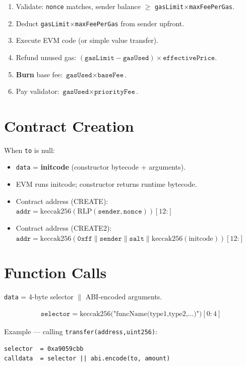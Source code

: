 \documentclass[12pt,a4paper,openany]{book}
\theoremstyle{definition}
\theoremstyle{plain}
\theoremstyle{remark}
\begin{document}
\begin{enumerate}
  \item Validate: \texttt{nonce} matches, sender balance $\geq$ \texttt{gasLimit}$\times$\texttt{maxFeePerGas}.
  \item Deduct \texttt{gasLimit}$\times$\texttt{maxFeePerGas} from sender upfront.
  \item Execute EVM code (or simple value transfer).
  \item Refund unused gas: $(\texttt{gasLimit}-\texttt{gasUsed})\times\texttt{effectivePrice}$.
  \item \textbf{Burn} base fee: $\texttt{gasUsed}\times\texttt{baseFee}$.
  \item Pay validator: $\texttt{gasUsed}\times\texttt{priorityFee}$.
\end{enumerate}

\section{Contract Creation}

When \texttt{to} is null:
\begin{itemize}
  \item \texttt{data} = \textbf{initcode} (constructor bytecode + arguments).
  \item EVM runs initcode; constructor returns runtime bytecode.
  \item Contract address (CREATE):
        $\texttt{addr}=\mathrm{keccak256}(\mathrm{RLP}(\texttt{sender},\texttt{nonce}))[12\text{:}]$
  \item Contract address (CREATE2):
        $\texttt{addr}=\mathrm{keccak256}(\texttt{0xff}\|\texttt{sender}\|\texttt{salt}\|\mathrm{keccak256(initcode)})[12\text{:}]$
\end{itemize}

\section{Function Calls}

\texttt{data} = 4-byte selector $\|$ ABI-encoded arguments.

\begin{align}
  \texttt{selector} = \mathrm{keccak256}(\text{"funcName(type1,type2,...)")}[0:4]
\end{align}

Example — calling \texttt{transfer(address,uint256)}:
\begin{lstlisting}[language={}]
selector  = 0xa9059cbb
calldata  = selector || abi.encode(to, amount)
\end{lstlisting}
\end{document}
